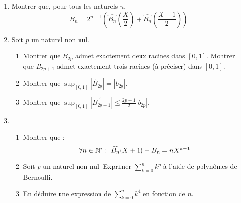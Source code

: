 \begin{enumerate}
\item Montrer que, pour tous les naturels $n$,
\begin{displaymath}
 B_n = 2^{n-1}\left( \widehat{B_n}(\frac{X}{2})+\widehat{B_n}(\frac{X+1}{2})\right) 
\end{displaymath}


\item Soit $p$ un naturel non nul. 
\begin{enumerate}
\item Montrer que $B_{2p}$ admet exactement deux racines dans $[0,1]$. Montrer que $B_{2p+1}$ admet exactement trois racines (à préciser) dans $[0,1]$.
\item Montrer que $\sup_{[0,1]}|\widetilde{B_{2p}}|=|b_{2p}|$.
\item Montrer que $\sup_{[0,1]}|\widetilde{B_{2p+1}}|\leq \frac{2p+1}{2}|b_{2p}|$.
\end{enumerate}

\item 
\begin{enumerate}
 \item Montrer que :
\begin{displaymath}
 \forall n\in \mathbb{N}^* :\;
\widehat{B_n}(X+1)-B_n = n X^{n-1}
\end{displaymath}
\item Soit $p$ un naturel non nul. Exprimer $\sum_{k=0}^nk^p$ à l'aide de polynômes de Bernoulli.
\item En déduire une expression de $\sum_{k=0}^nk^4$ en fonction de $n$.
\end{enumerate}

\end{enumerate}